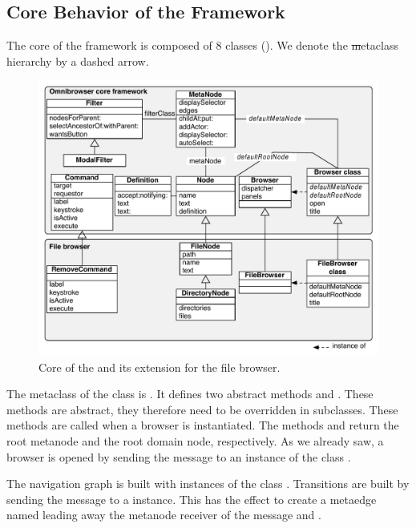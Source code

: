 \documentclass[a4paper,10pt,twoside]{book}
\begin{document}
\subsection{Core Behavior of the Framework}\label{sec:corebehavior}

The core of the \ob framework is composed of 8 classes (). We denote the \st metaclass hierarchy by a dashed arrow. 

\begin{figure}[!ht]
\begin{center}
\includegraphics[scale=0.52]{Core}
\caption{Core of the \obf and its extension for the file browser.} 
\end{center}
\end{figure}

The metaclass of the class  is . It defines two abstract methods  and . These methods are abstract, they therefore need to be overridden in subclasses. These methods are called when a browser is instantiated. The methods   and  return the root metanode and the root domain node, respectively. As we already saw, a browser is opened by sending the message  to an instance of the class .

The navigation graph is built with instances of the class . Transitions are built by sending the message  to a  instance. This has the effect to create a metaedge named  leading away the metanode receiver of the message and .
\end{document}
